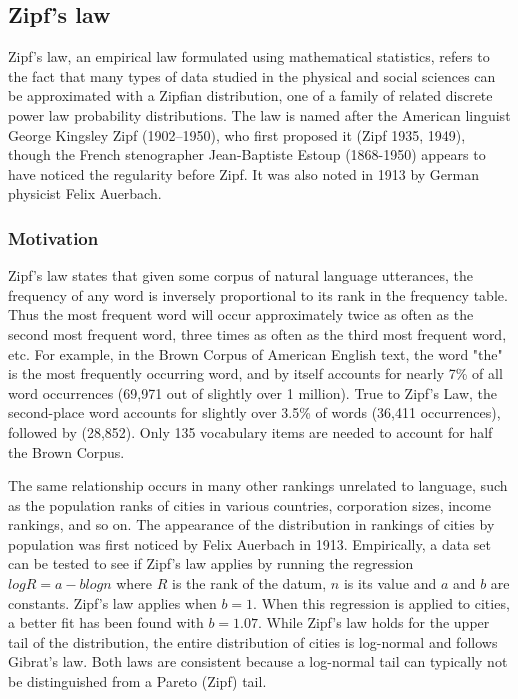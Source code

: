   \subsection{Zipf's law}
  
    Zipf's law, an empirical law formulated using mathematical statistics, refers to the fact that many types of data studied in the physical and social sciences can be approximated with a Zipfian distribution, one of a family of related discrete power law probability distributions. The law is named after the American linguist George Kingsley Zipf (1902–1950), who first proposed it (Zipf 1935, 1949), though the French stenographer Jean-Baptiste Estoup (1868-1950) appears to have noticed the regularity before Zipf\cite{ManningSchutze1999}. It was also noted in 1913 by German physicist Felix Auerbach\cite{Auerbach1913}.
    
    \subsubsection{Motivation}
    
      Zipf's law states that given some corpus of natural language utterances, the frequency of any word is inversely proportional to its rank in the frequency table. Thus the most frequent word will occur approximately twice as often as the second most frequent word, three times as often as the third most frequent word, etc. For example, in the Brown Corpus of American English text, the word "the" is the most frequently occurring word, and by itself accounts for nearly 7\% of all word occurrences (69,971 out of slightly over 1 million). True to Zipf's Law, the second-place word  accounts for slightly over 3.5\% of words (36,411 occurrences), followed by  (28,852). Only 135 vocabulary items are needed to account for half the Brown Corpus.
  
      The same relationship occurs in many other rankings unrelated to language, such as the population ranks of cities in various countries, corporation sizes, income rankings, and so on. The appearance of the distribution in rankings of cities by population was first noticed by Felix Auerbach in 1913\cite{Auerbach1913}. Empirically, a data set can be tested to see if Zipf's law applies by running the regression $log R = a - b log n$ where $R$ is the rank of the datum, $n$ is its value and $a$ and $b$ are constants. Zipf's law applies when $b = 1$. When this regression is applied to cities, a better fit has been found with $b = 1.07$. While Zipf's law holds for the upper tail of the distribution, the entire distribution of cities is log-normal and follows Gibrat's law\cite{Eeckhout2004}. Both laws are consistent because a log-normal tail can typically not be distinguished from a Pareto (Zipf) tail.
    
